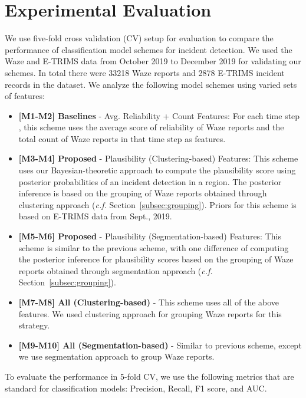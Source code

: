 \documentclass[conference]{IEEEtran}
\begin{document}
\section{Experimental Evaluation}\label{sec:experiments}
We use five-fold cross validation (CV) setup for evaluation to compare the performance of classification model schemes for incident detection. We used the Waze and E-TRIMS data from October 2019 to December 2019 for validating our schemes. In total there were 33218 Waze reports and 2878 E-TRIMS incident records in the dataset. 
We analyze the following model schemes using varied sets of features:   
\begin{itemize}[leftmargin=*]
    \item \textbf{[M1-M2] Baselines} - Avg. Reliability + Count Features: For each time step , this scheme uses the average score of reliability of Waze reports and the total count of Waze reports in that time step as features. 

    \item \textbf{[M3-M4] Proposed} - Plausibility (Clustering-based) Features: This scheme uses our Bayesian-theoretic approach to compute the plausibility score using posterior probabilities of an incident detection in a region. The posterior inference is based on the grouping of Waze reports obtained through clustering approach (\textit{c.f.} Section~\ref{subsec:grouping}). Priors for this scheme is based on E-TRIMS data from Sept., 2019. 
    
    \item \textbf{[M5-M6] Proposed} - Plausibility (Segmentation-based) Features: This scheme is similar to the previous scheme, with one difference of computing the posterior inference for plausibility scores based on the grouping of Waze reports obtained through segmentation approach (\textit{c.f.} Section~\ref{subsec:grouping}). 

    \item \textbf{[M7-M8] All (Clustering-based)} - This scheme uses all of the above features. We used clustering approach for grouping Waze reports for this strategy. 
    
    \item \textbf{[M9-M10] All (Segmentation-based)} - Similar to previous scheme, except we use segmentation approach to group Waze reports. 
    
\end{itemize}

To evaluate the performance in 5-fold CV, we use the following metrics that are standard for classification models: Precision, Recall, F1 score, and AUC. 
\end{document}
